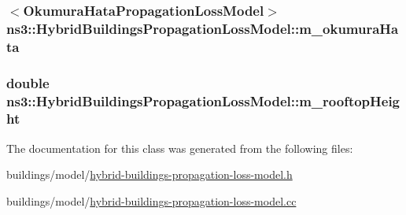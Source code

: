 \subsubsection[{\texorpdfstring{m\+\_\+okumura\+Hata}{m_okumuraHata}}]{$<${\bf Okumura\+Hata\+Propagation\+Loss\+Model}$>$ ns3\+::\+Hybrid\+Buildings\+Propagation\+Loss\+Model\+::m\+\_\+okumura\+Hata\hspace{0.3cm}{\ttfamily [private]}}\hypertarget{classns3_1_1HybridBuildingsPropagationLossModel_acb20ff03479b11d6afb426603428b07d}{}\label{classns3_1_1HybridBuildingsPropagationLossModel_acb20ff03479b11d6afb426603428b07d}
\subsubsection[{\texorpdfstring{m\+\_\+rooftop\+Height}{m_rooftopHeight}}]{\setlength{\rightskip}{0pt plus 5cm}double ns3\+::\+Hybrid\+Buildings\+Propagation\+Loss\+Model\+::m\+\_\+rooftop\+Height\hspace{0.3cm}{\ttfamily [private]}}\hypertarget{classns3_1_1HybridBuildingsPropagationLossModel_a36a81fabbc1c572da78ed3dbf6ba6bb8}{}\label{classns3_1_1HybridBuildingsPropagationLossModel_a36a81fabbc1c572da78ed3dbf6ba6bb8}


The documentation for this class was generated from the following files\+:\begin{DoxyCompactItemize}
\item 
buildings/model/\hyperlink{hybrid-buildings-propagation-loss-model_8h}{hybrid-\/buildings-\/propagation-\/loss-\/model.\+h}\item 
buildings/model/\hyperlink{hybrid-buildings-propagation-loss-model_8cc}{hybrid-\/buildings-\/propagation-\/loss-\/model.\+cc}\end{DoxyCompactItemize}
